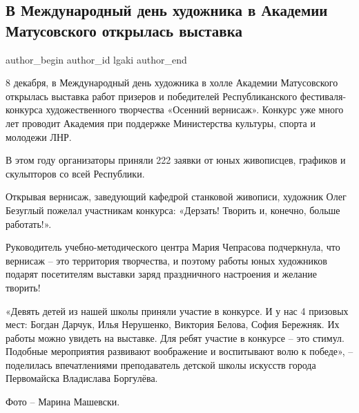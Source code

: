  
 
 
 
 
\subsection{В Международный день художника в Академии Матусовского открылась выставка}
\label{sec:08_12_2021.stz.edu.lnr.lgaki.1.vystavka_den_hudozhnika}

\ifcmt
 author_begin
   author_id lgaki
 author_end
\fi

8 декабря, в Международный день художника в холле Академии Матусовского
открылась выставка работ призеров и победителей Республиканского
фестиваля-конкурса художественного творчества «Осенний вернисаж». Конкурс уже
много лет проводит Академия при поддержке Министерства культуры, спорта и
молодежи ЛНР.


В этом году организаторы приняли 222 заявки от юных живописцев, графиков и
скульпторов со всей Республики.

Открывая вернисаж, заведующий кафедрой станковой живописи, художник Олег
Безуглый пожелал участникам конкурса: «Дерзать! Творить и, конечно, больше
работать!».


Руководитель учебно-методического центра Мария Чепрасова подчеркнула, что
вернисаж – это территория творчества, и поэтому работы юных художников подарят
посетителям выставки заряд праздничного настроения и желание творить!


«Девять детей из нашей школы приняли участие в конкурсе. И у нас 4 призовых
мест: Богдан Дарчук, Илья Нерушенко, Виктория Белова, София Бережняк. Их работы
можно увидеть на выставке. Для ребят участие в конкурсе – это стимул. Подобные
мероприятия развивают воображение и воспитывают волю к победе», – поделилась
впечатлениями преподаватель детской школы искусств города Первомайска
Владислава Боргулёва.


Фото – Марина Машевски.

